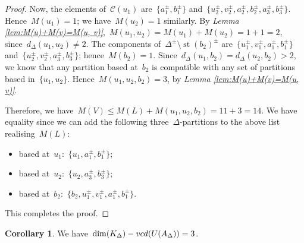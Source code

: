\documentclass[11pt]{amsart}
\theoremstyle{definition}
\theoremstyle{definition}
\theoremstyle{definition}
\theoremstyle{definition}
\newtheorem{corollary}[theorem]{Corollary}
\newcommand{\calC}{\mathcal{C}}
\newcommand{\str}[1]{\operatorname{st}({#1})} %
\begin{document}
\begin{proof}
Now, the elements of~$\calC(u_1)$ are~$\{a_1^\pm, b_1^\pm\}$ and~$\{u_2^\pm, v_2^\pm, a_2^\pm, b_2^\pm, a_3^\pm, b_3^\pm\}$. Hence~$M(u_1) = 1$; we have~$M(u_2) = 1$ similarly. By \textit{Lemma \ref{lem:M(u)+M(v)=M(u, v)}},~$M(u_1, u_2) = M(u_1) + M(u_2) = 1 + 1 = 2$, since~$d_\Delta(u_1, u_2) \neq 2$. The components of~$\Delta^\pm \setminus \str{b_2}^\pm$ are~$\{u_1^\pm, v_1^\pm, a_1^\pm, b_1^\pm\}$ and~$\{u_2^\pm, v_2^\pm, a_3^\pm, b_3^\pm\}$; hence~$M(b_2) = 1$. Since~$d_\Delta(u_1, b_2) = d_\Delta(u_2, b_2) > 2$, we know that any partition based at~$b_2$ is compatible with any set of partitions based in~$\{u_1, u_2\}$. Hence~$M(u_1, u_2, b_2) = 3$, by \emph{Lemma \ref{lem:M(u)+M(v)=M(u, v)}}.

Therefore, we have~$M(V) \leq M(L) + M(u_1, u_2, b_2) = 11 + 3 = 14$. We have equality since we can add the following three~$\Delta$-partitions to the above list realising~$M(L)$:
\begin{itemize}
    \item based at~$u_1$:~$\{u_1, a_1^\pm, b_1^\pm\}$;
    \item based at~$u_2$:~$\{u_2, a_3^\pm, b_3^\pm\}$;
    \item based at~$b_2$:~$\{b_2, u_1^\pm, v_1^\pm, a_1^\pm, b_1^\pm\}$.
\end{itemize}
This completes the proof.
\end{proof}

\begin{corollary}\label{cor:counterexample to suff condition hoped-theorem}
    We have~$\dim(K_\Delta) - \textsc{vcd}(U(A_\Delta)) = 3$.
\end{corollary}
\end{document}
